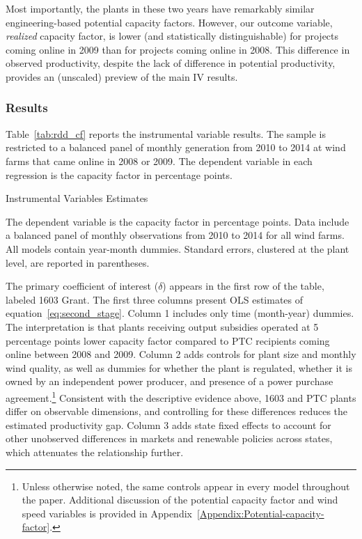 \documentclass[12pt]{article}
\begin{document}
Most importantly, the plants in these two years have remarkably similar engineering-based potential capacity factors. However, our outcome variable, \textit{realized} capacity factor, is lower (and statistically distinguishable) for projects coming online in 2009 than for projects coming online in 2008. This difference in observed productivity, despite the lack of difference in potential productivity, provides an (unscaled) preview of the main IV results. 

\subsubsection*{Results \label{sec:results:rd}}

Table~\ref{tab:rdd_cf} reports the instrumental variable results. The sample is restricted to a balanced panel of monthly generation from 2010 to 2014 at wind farms that came online in 2008 or 2009. The dependent variable in each regression is the capacity factor in percentage points.

\begin{table}[h]
\caption{Instrumental Variables Estimates \label{tab:rdd_cf}}
\begin{center} {\footnotesize{}} \end{center}
\footnotesize
The dependent variable is the capacity factor in percentage points. Data include a balanced panel of monthly observations from 2010 to 2014 for all wind farms. All models contain year-month dummies. Standard errors, clustered at the plant level, are reported in parentheses.
\end{table}

The primary coefficient of interest ($\delta$) appears in the first row of the table, labeled 1603 Grant. The first three columns present OLS estimates of equation~\ref{eq:second_stage}. Column 1 includes only time (month-year) dummies. The interpretation is that plants receiving output subsidies operated at 5 percentage points lower capacity factor compared to PTC recipients coming online between 2008 and 2009. Column 2 adds controls for plant size and monthly wind quality, as well as dummies for whether the plant is regulated, whether it is owned by an independent power producer, and presence of a power purchase agreement.\footnote{Unless otherwise noted, the same controls appear in every model throughout the paper. Additional discussion of the potential capacity factor and wind speed variables is provided in Appendix~\ref{Appendix:Potential-capacity-factor}.} Consistent with the descriptive evidence above, 1603 and PTC plants differ on observable dimensions, and controlling for these differences reduces the estimated productivity gap. Column 3 adds state fixed effects to account for other unobserved differences in markets and renewable policies across states, which attenuates the relationship further.
\end{document}
